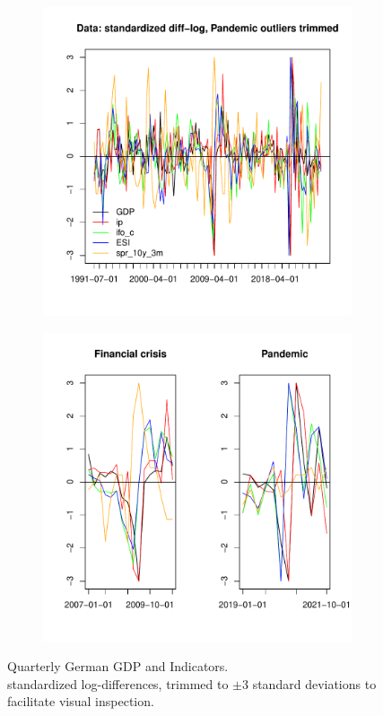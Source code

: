 \documentclass[11pt,a4paper]{article}
\begin{document}
\begin{figure}
    \begin{subfigure}[t]{0.49\textwidth}
        \centering
        \includegraphics[width=\linewidth]{./Figures/Data.pdf}
        \label{fig:data}
    \end{subfigure}
    \hfill
    \begin{subfigure}[t]{0.49\textwidth}
        \centering
        \includegraphics[width=\linewidth]{./Figures/data_lags.pdf}
        \label{fig:data_lags}
    \end{subfigure}
    \caption{Quarterly German GDP and Indicators.\\ standardized log-differences, trimmed to $\pm 3$ standard deviations to facilitate visual inspection.}
\end{figure}
\end{document}
